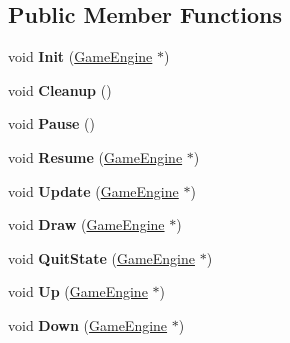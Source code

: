\subsection*{Public Member Functions}
\begin{DoxyCompactItemize}
\item 
\hypertarget{class_load_state_ad799f3488230d6fad1d054631040c4ac}{}void {\bfseries Init} (\hyperlink{class_game_engine}{Game\+Engine} $\ast$)\label{class_load_state_ad799f3488230d6fad1d054631040c4ac}

\item 
\hypertarget{class_load_state_a0dfae18c2186d9284b73edf0e7b356e9}{}void {\bfseries Cleanup} ()\label{class_load_state_a0dfae18c2186d9284b73edf0e7b356e9}

\item 
\hypertarget{class_load_state_a55f909668a9328163536c3e8c8c384fd}{}void {\bfseries Pause} ()\label{class_load_state_a55f909668a9328163536c3e8c8c384fd}

\item 
\hypertarget{class_load_state_a293be8f1e75625b80af7a88f9dc2861c}{}void {\bfseries Resume} (\hyperlink{class_game_engine}{Game\+Engine} $\ast$)\label{class_load_state_a293be8f1e75625b80af7a88f9dc2861c}

\item 
\hypertarget{class_load_state_a3a5cefa7a201f65d76d9b0c4e3817b86}{}void {\bfseries Update} (\hyperlink{class_game_engine}{Game\+Engine} $\ast$)\label{class_load_state_a3a5cefa7a201f65d76d9b0c4e3817b86}

\item 
\hypertarget{class_load_state_a8ac32a1397ecc45521a1d872306a1602}{}void {\bfseries Draw} (\hyperlink{class_game_engine}{Game\+Engine} $\ast$)\label{class_load_state_a8ac32a1397ecc45521a1d872306a1602}

\item 
\hypertarget{class_load_state_abcf7929bcc5ee5821840cdbb0c120f7a}{}void {\bfseries Quit\+State} (\hyperlink{class_game_engine}{Game\+Engine} $\ast$)\label{class_load_state_abcf7929bcc5ee5821840cdbb0c120f7a}

\item 
\hypertarget{class_load_state_a46cca5bb92bd098c3ebf366313ffe562}{}void {\bfseries Up} (\hyperlink{class_game_engine}{Game\+Engine} $\ast$)\label{class_load_state_a46cca5bb92bd098c3ebf366313ffe562}

\item 
\hypertarget{class_load_state_a4c48a8758b839bc4dee627c60bcf6587}{}void {\bfseries Down} (\hyperlink{class_game_engine}{Game\+Engine} $\ast$)\label{class_load_state_a4c48a8758b839bc4dee627c60bcf6587}


\end{DoxyCompactItemize}
